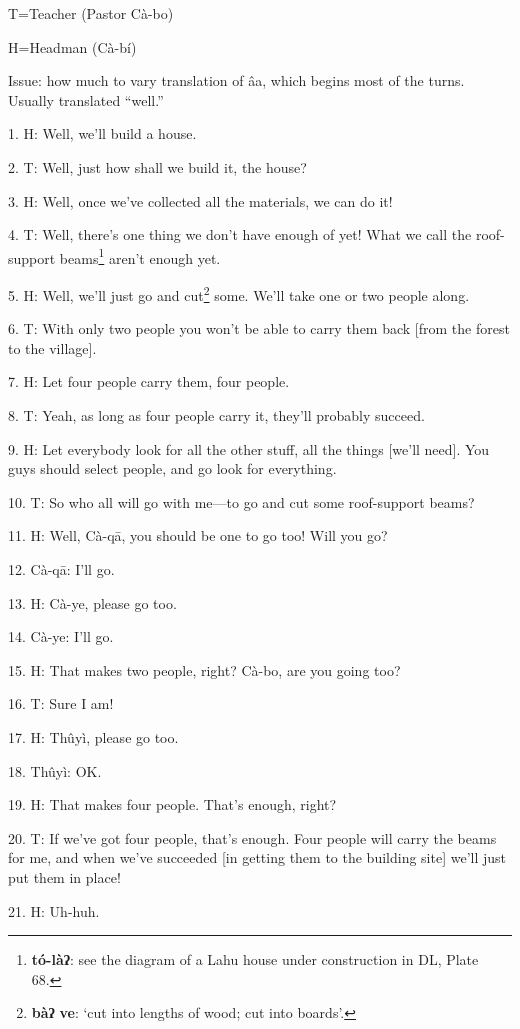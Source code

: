 \setcounter{footnote}{0}

T=Teacher (Pastor Cà-bo)

H=Headman (Cà-bí)

Issue: how much to vary translation of âa, which begins most of the turns. Usually
translated ``well.''

1. H: Well, we'll build a house.

2. T: Well, just how shall we build it, the house?

3. H: Well, once we've collected all the materials, we can do it!

4. T: Well, there's one thing we don't have enough of yet! What we call the roof-support
beams\footnote{\textbf{tó-làʔ}: see the diagram of a Lahu house under construction in DL, Plate 68.} aren't enough yet.

5. H: Well, we'll just go and cut\footnote{\textbf{bàʔ} \textbf{ve}: `cut into lengths of wood; cut into boards'.} some. We'll take one or two people along.

6. T: With only two people you won't be able to carry them back [from the forest
to the village].

7. H: Let four people carry them, four people.

8. T: Yeah, as long as four people carry it, they'll probably succeed.

9. H: Let everybody look for all the other stuff, all the things [we'll need].
You guys should select people, and go look for everything.

10. T: So who all will go with me---to go and cut some roof-support beams?

11. H: Well, Cà-qā, you should be one to go too! Will you go?

12. Cà-qā: I'll go.

13. H: Cà-ye, please go too.

14. Cà-ye: I'll go.

15. H: That makes two people, right? Cà-bo, are you going too?

16. T: Sure I am!

17. H: Thûyì, please go too.

18. Thûyì: OK.

19. H: That makes four people. That's enough, right?

20. T: If we've got four people, that's enough. Four people will carry the beams
for me, and when we've succeeded [in getting them to the building site] we'll just
put them in place!

21. H: Uh-huh.


